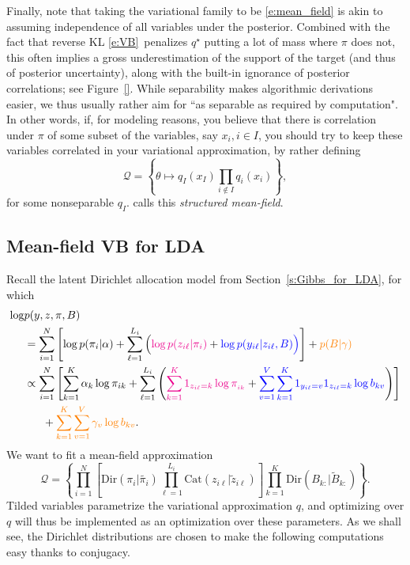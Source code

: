 Finally, note that taking the variational family to be \eqref{e:mean_field} is akin to assuming independence of all variables under the posterior.
Combined with the fact that reverse KL \eqref{e:VB} penalizes $q^\star$ putting a lot of mass where $\pi$ does not, this often implies a gross underestimation of the support of the target (and thus of posterior uncertainty), along with the built-in ignorance of posterior correlations; see Figure~\ref{}.
While separability makes algorithmic derivations easier, we thus usually rather aim for ``as separable as required by computation".
In other words, if, for modeling reasons, you believe that there is correlation under $\pi$ of some subset of the variables, say $x_i, i\in I$, you should try to keep these variables correlated in your variational approximation, by rather defining
$$
\mathcal Q = \left\{\theta\mapsto q_I(x_I) \prod_{i \notin I} q_i(x_i) \right\},
$$
for some nonseparable $q_I$.
\cite[Chapter 23]{Mur12} calls this \emph{structured mean-field}.

\subsection{Mean-field VB for LDA}
\label{s:VB_for_LDA}
Recall the latent Dirichlet allocation model from Section~\ref{s:Gibbs_for_LDA}, for which
\begin{align}
\log &p(y, z, \pi, B)\\
&=\sum_{i=1}^N \left[\log p(\pi_i\vert \alpha) + \sum_{\ell=1}^{L_i} \Big(\textcolor{magenta}{\log p(z_{i\ell}\vert\pi_i)} + \textcolor{blue}{\log p(y_{i\ell}\vert z_{i\ell}, B)\Big)}\right] + \textcolor{orange}{p(B\vert \gamma)}\nonumber\\
&\propto \sum_{i=1}^N \left[\sum_{k=1}^K \alpha_k \log \pi_{ik} + \sum_{\ell=1}^{L_i} \left(\textcolor{magenta}{\sum_{k=1}^K 1_{z_{i\ell}=k}\log\pi_{_{ik}}} + \textcolor{blue}{\sum_{v=1}^V \sum_{k=1}^K 1_{y_{i\ell}=v}1_{z_{i\ell}=k} \log b_{kv}}\right)\right] \nonumber\\
&~~~~~+ \textcolor{orange}{\sum_{k=1}^K \sum_{v=1}^V \gamma_v\log b_{kv}}. \label{e:LDA_joint}
\end{align}
We want to fit a mean-field approximation
$$
\mathcal Q = \left\{ \prod_{i=1}^N \left[\text{Dir}(\pi_i\vert\widetilde{\pi_i}) \prod_{\ell=1}^{L_i} \text{Cat}(z_{i\ell}\vert\widetilde{z}_{i\ell}) \right] \prod_{k=1}^K \text{Dir}(B_{k:}\vert \widetilde{B}_{k:}) \right\}.
$$
Tilded variables parametrize the variational approximation $q$, and optimizing over $q$ will thus be implemented as an optimization over these parameters.
As we shall see, the Dirichlet distributions are chosen to make the following computations easy thanks to conjugacy.

